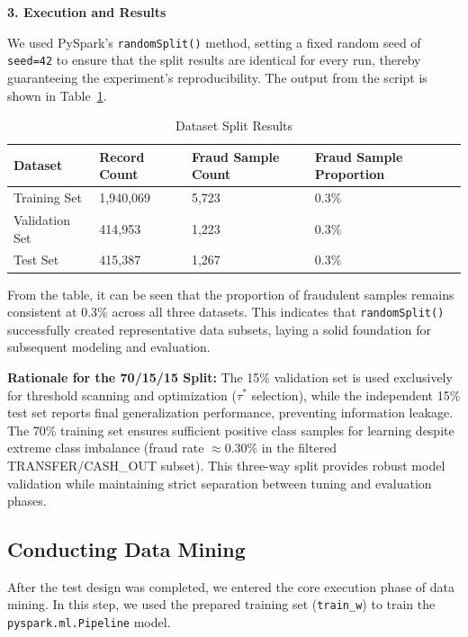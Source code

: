 \documentclass[sigplan,screen]{acmart}
\begin{document}
\textbf{3. Execution and Results}

We used PySpark's \texttt{randomSplit()} method, setting a fixed random seed of \texttt{seed=42} to ensure that the split results are identical for every run, thereby guaranteeing the experiment's reproducibility. The output from the script is shown in Table~\ref{tab:split-results}.

\begin{table}[h]
\centering
\caption{Dataset Split Results}
\label{tab:split-results}
\begin{tabular}{|p{3cm}|p{2.5cm}|p{3cm}|p{3.5cm}|}
\hline
\textbf{Dataset} & \textbf{Record Count} & \textbf{Fraud Sample Count} & \textbf{Fraud Sample Proportion} \\
\hline
Training Set & 1,940,069 & 5,723 & 0.3\% \\
\hline
Validation Set & 414,953 & 1,223 & 0.3\% \\
\hline
Test Set & 415,387 & 1,267 & 0.3\% \\
\hline
\end{tabular}
\end{table}

From the table, it can be seen that the proportion of fraudulent samples remains consistent at 0.3\% across all three datasets. This indicates that \texttt{randomSplit()} successfully created representative data subsets, laying a solid foundation for subsequent modeling and evaluation.

\textbf{Rationale for the 70/15/15 Split:} The 15\% validation set is used exclusively for threshold scanning and optimization ($\tau^*$ selection), while the independent 15\% test set reports final generalization performance, preventing information leakage. The 70\% training set ensures sufficient positive class samples for learning despite extreme class imbalance (fraud rate $\approx$0.30\% in the filtered TRANSFER/CASH\_OUT subset). This three-way split provides robust model validation while maintaining strict separation between tuning and evaluation phases.

\subsection{Conducting Data Mining}

After the test design was completed, we entered the core execution phase of data mining. In this step, we used the prepared training set (\texttt{train\_w}) to train the \texttt{pyspark.ml.Pipeline} model.
\end{document}
